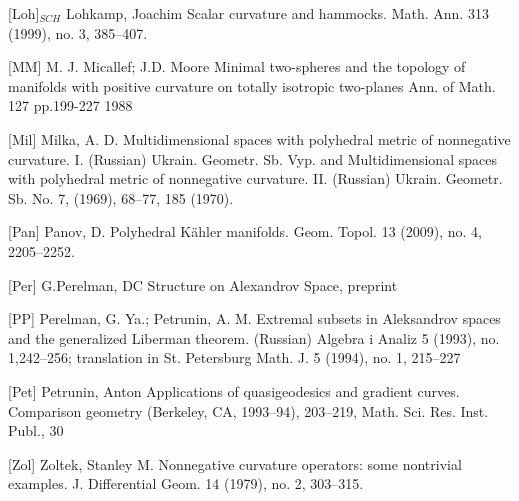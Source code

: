 \documentclass{article}
\begin{document}
[Loh]$_{SCH}$ Lohkamp, Joachim Scalar curvature and hammocks.
Math. Ann. 313 (1999), no. 3, 385--407.


[MM]
M. J. Micallef; J.D. Moore
Minimal two-spheres and the topology of manifolds
with positive curvature on totally isotropic two-planes
Ann. of Math.
127 pp.199-227
1988


[Mil] Milka, A. D.
Multidimensional spaces with polyhedral metric of nonnegative curvature. I.
(Russian) Ukrain. Geometr. Sb. Vyp.
and
Multidimensional spaces with polyhedral metric of nonnegative curvature. II.
(Russian) Ukrain. Geometr. Sb. No. 7,
(1969), 68--77, 185 (1970).

[Pan] Panov, D. Polyhedral Kähler manifolds. Geom. Topol. 13 (2009), no. 4, 2205--2252.

[Per] G.Perelman, DC Structure on Alexandrov Space, preprint

[PP] Perelman, G. Ya.; Petrunin, A. M.
Extremal subsets in Aleksandrov spaces and the generalized Liberman theorem.
(Russian) Algebra i Analiz 5 (1993), no. 1,242--256;
translation in St. Petersburg Math. J. 5 (1994), no. 1, 215--227

[Pet] Petrunin, Anton Applications of quasigeodesics and gradient
curves. Comparison geometry (Berkeley, CA, 1993--94), 203--219,
Math. Sci. Res. Inst. Publ., 30

[Zol] Zoltek, Stanley M. Nonnegative curvature operators: some nontrivial examples. J. Differential Geom. 14 (1979), no. 2,
   303--315.
\end{document}
